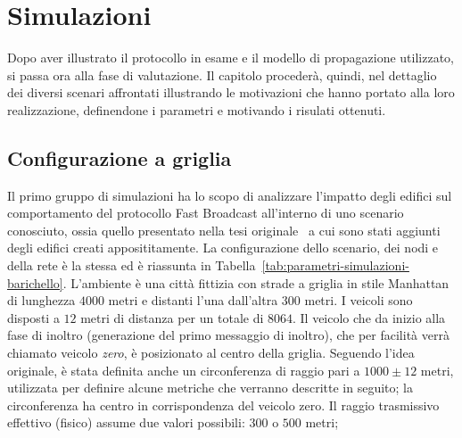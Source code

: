 
\chapter{Simulazioni}\label{chap:simulazioni}
Dopo aver illustrato il protocollo in esame e il modello di propagazione utilizzato, si passa ora alla fase di valutazione.
Il capitolo procederà, quindi, nel dettaglio dei diversi scenari affrontati illustrando
le motivazioni che hanno portato alla loro realizzazione, definendone i parametri e motivando i risulati ottenuti.
%
\section{Configurazione a griglia}\label{sec:configurazione-griglia}
Il primo gruppo di simulazioni ha lo scopo di analizzare l'impatto degli edifici sul comportamento del protocollo
Fast Broadcast all'interno di uno scenario conosciuto, ossia quello presentato nella tesi originale~\cite{Barichello2017propagazione}
a cui sono stati aggiunti degli edifici creati apposititamente.
La configurazione dello scenario, dei nodi e della rete è la stessa ed è riassunta in Tabella~\ref{tab:parametri-simulazioni-barichello}.
L'ambiente è una città fittizia con strade a griglia in stile Manhattan di lunghezza $4000$ metri e distanti l'una dall'altra $300$ metri.
I veicoli sono disposti a $12$ metri di distanza per un totale di $8064$.
Il veicolo che da inizio alla fase di inoltro (generazione del primo messaggio di inoltro),
che per facilità verrà chiamato veicolo \textit{zero}, è posizionato al centro della griglia.
Seguendo l'idea originale, è stata definita anche un circonferenza di raggio pari a $1000\pm12$ metri, utilizzata per definire alcune metriche che verranno descritte in seguito;
la circonferenza ha centro in corrispondenza del veicolo zero.
Il raggio trasmissivo effettivo (fisico) assume due valori possibili: $300$ o $500$ metri;
%
